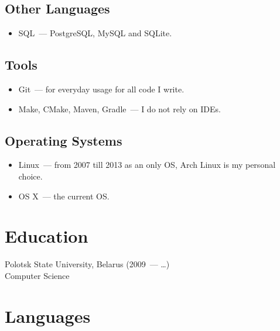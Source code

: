     \subsection*{Other Languages}

      \begin{itemize}

        \item SQL~--- PostgreSQL, MySQL and SQLite.

      \end{itemize}

    \subsection*{Tools}

      \begin{itemize}

        \item Git~--- for everyday usage for all code I write.

        \item Make, CMake, Maven, Gradle~--- I do not rely on IDEs.

      \end{itemize}

    \subsection*{Operating Systems}

      \begin{itemize}

        \item Linux~--- from 2007 till 2013 as an only OS, Arch Linux is my personal choice.

        \item OS X~--- the current OS.

      \end{itemize}


  \section*{Education}

    Polotsk State University, Belarus (2009~--- \dots) \\
    Computer Science


  \section*{Languages}

